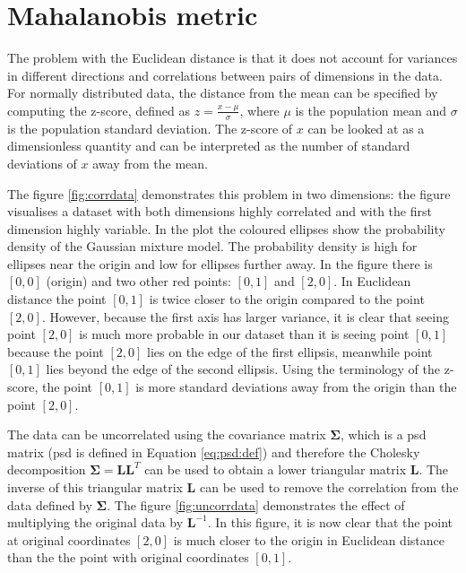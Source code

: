 \documentclass[12pt,a4paper]{report}
\begin{document}

\section{Mahalanobis metric} \label{chap:intro:mah}

The problem with the Euclidean distance is that it does not account for variances in different directions and correlations between pairs of dimensions in the data. For normally distributed data, the distance from the mean can be specified by computing the z-score, defined as $z = \frac{x-\mu}{\sigma}$, where $\mu$ is the population mean and $\sigma$ is the population standard deviation. The z-score of $x$ can be looked at as a dimensionless quantity and can be interpreted as the number of standard deviations of $x$ away from the mean.

The figure \ref{fig:corrdata} demonstrates this problem in two dimensions: the figure visualises a dataset with both dimensions highly correlated and with the first dimension highly variable. In the plot the coloured ellipses show the probability density of the Gaussian mixture model. The probability density is high for ellipses near the origin and low for ellipses further away. In the figure there is $[0,0]$ (origin) and two other red points: $[0,1]$ and $[2,0]$. In Euclidean distance the point $[0,1]$ is twice closer to the origin compared to the point $[2,0]$. However, because the first axis has larger variance, it is clear that seeing point $[2,0]$ is much more probable in our dataset than it is seeing point $[0,1]$ because the point $[2,0]$ lies on the edge of the first ellipsis, meanwhile point $[0,1]$ lies beyond the edge of the second ellipsis. Using the terminology of the z-score, the point $[0,1]$ is more standard deviations away from the origin than the point $[2,0]$.


The data can be uncorrelated using the covariance matrix $\bm{\Sigma}$, which is a \ac{psd} matrix (\ac{psd} is defined in Equation \ref{eq:psd:def}) and therefore the Cholesky decomposition $\bm{\Sigma}=\bm{L}\bm{L}^T$ can be used to obtain a lower triangular matrix $\bm{L}$. The inverse of this triangular matrix $\bm{L}$ can be used to remove the correlation from the data defined by $\bm{\Sigma}$. The figure \ref{fig:uncorrdata} demonstrates the effect of multiplying the original data by $\bm{L}^{-1}$. In this figure, it is now clear that the point at original coordinates $[2,0]$ is much closer to the origin in Euclidean distance than the the point with original coordinates $[0,1]$.
\end{document}
